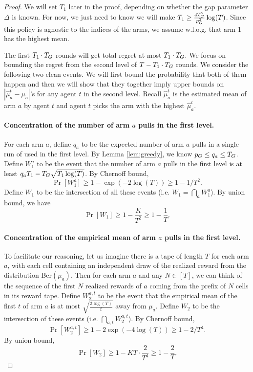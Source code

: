 \begin{proof}
  We will set $T_1$ later in the proof, depending on whether the gap
  parameter $\Delta$ is known. For now, we just need to know we will
  make $T_1 \geq \frac{4T_G^2}{p_G^2}\log(T)$. Since this policy is
  agnostic to the indices of the arms, we assume w.l.o.g. that arm 1
  has the highest mean.

  The first $T_1 \cdot T_G$ rounds will get total regret at most
  $T_1 \cdot T_G$.  We focus on bounding the regret from the second
  level of $T - T_1 \cdot T_G$ rounds. We consider the following two
  clean events. We will first bound the probability that both of them
  happen and then we will show that they together imply upper bounds
  on $|\hat{\mu}^t_a - \mu_a|$'s for any agent $t$ in the second
  level. Recall $\hat{\mu}^t_a$ is the estimated mean of arm $a$ by
  agent $t$ and agent $t$ picks the arm with the highest
  $\hat{\mu}^t_a$.

  \paragraph{Concentration of the number of arm $a$ pulls in the first
    level.}
  For each arm $a$, define $q_a$ to be the expected number of arm $a$
  pulls in a single run of \ALGG used in the first level.  By Lemma
  \ref{lem:greedy}, we know $p_G \leq q_a \leq T_G$. Define $W_1^a$
  to be the event that the number of arm $a$ pulls in the first level
  is at least $q_a T_1- T_G \sqrt{T_1\log(T)}$.    By
  Chernoff bound,
  \[
    \Pr[W_1^a] \geq 1-\exp(-2\log(T)) \geq 1-1/T^2.
  \]
Define $W_1$ to be the intersection of all these events (i.e. $W_1 = \bigcap_{a}W_1^a$). By union bound, we have
\[
\Pr[W_1] \geq 1- \frac{K}{T^2} \geq 1 - \frac{1}{T}.
\]
\paragraph{Concentration of the empirical mean of arm $a$ pulls in the first level.}
To facilitate our reasoning, let us imagine there is a tape of length
$T$ for each arm $a$, with each cell containing an independent draw of
the realized reward from the distribution Ber$(\mu_a)$. Then for each
arm $a$ and any $N\in [T]$, we can think of the sequence of the first
$N$ realized rewards of $a$ coming from the prefix of $N$ cells in its
reward tape. Define $W^{a,t}_2$ to be the event that the empirical
mean of the first $t$  of arm $a$
is at most $\sqrt{\frac{2\log(T)}{t}}$ away from $\mu_a$. Define $W_2$
to be the intersection of these events (i.e.
$\bigcap_{a,t} W^{a,t}_2$).  By Chernoff bound,
\[
\Pr[W^{a,t}_2] \geq 1 - 2\exp(-4\log(T)) \geq 1-2/T^4.
\]
By union bound, 
\[
\Pr[W_2] \geq 1 - KT \cdot \frac{2}{T^4} \geq 1 - \frac{2}{T}.
\]




\end{proof}
